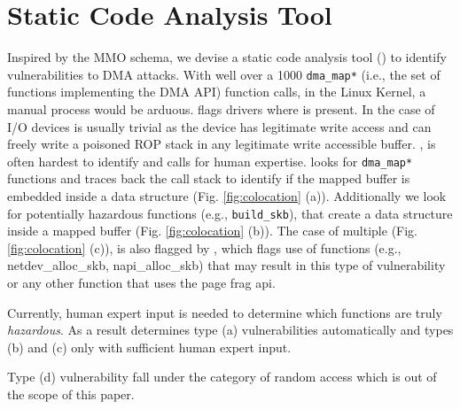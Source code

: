 \section{Static Code Analysis Tool}\label{sec:static-analysis}

Inspired by the MMO schema, we devise a static code analysis tool (\tool) to identify vulnerabilities to DMA attacks. With well over a 1000 \texttt{dma\_map*} (i.e., the set of functions implementing the DMA API) function calls, in the Linux Kernel, a manual process would be arduous. \tool flags drivers where \oportunity{} is present. In the case of I/O devices \motivation{} is usually trivial as the device has legitimate write access and can freely write a poisoned ROP stack in any legitimate write accessible buffer. \means{}, is often hardest to identify and calls for human expertise. \tool looks for \texttt{dma\_map*} functions and traces back the call stack to identify if the mapped buffer is embedded inside a data structure (Fig. \ref{fig:colocation} (a)). Additionally we look for potentially hazardous functions (e.g., \texttt{build\_skb}), that create a data structure inside a mapped buffer (Fig. \ref{fig:colocation} (b)). 
The case of multiple \iova{} (Fig. \ref{fig:colocation} (c)), is also flagged by \tool, which flags use of functions (e.g., netdev\_alloc\_skb, napi\_alloc\_skb) that may result in this type of vulnerability or any other function that uses the page frag api. 

Currently, human expert input is needed to determine which functions are truly \emph{hazardous}. As a result \tool determines type (a) vulnerabilities automatically and types (b) and (c) only with sufficient human expert input. 


Type (d) vulnerability fall under the category of random access 
which is out of the scope of this paper.

